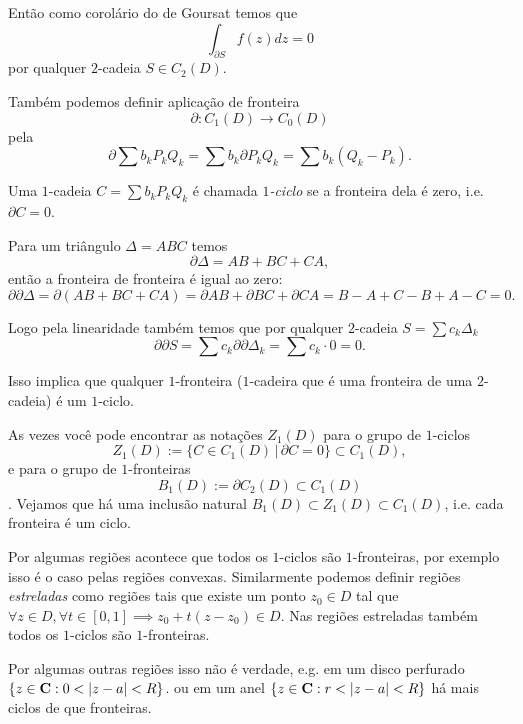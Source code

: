 Então como corolário do  de Goursat temos que
\[ \int_{\partial S} f(z) dz = 0 \]
por qualquer $2$-cadeia $S \in C_2(D)$.

Também podemos definir aplicação de fronteira 
\[ \partial : C_1(D) \to C_0(D) \]
pela
\[ \partial \sum b_k P_k Q_k = \sum b_k \partial  P_kQ_k = \sum b_k (Q_k - P_k). \]

Uma $1$-cadeia $C = \sum b_k P_k Q_k$ é chamada \emph{$1$-ciclo} se a fronteira dela é zero, i.e. $\partial C = 0$.

Para um triângulo $\Delta = ABC$ temos
\[
\partial \Delta = AB + BC + CA,
\]
então a fronteira de fronteira é igual ao zero:
\[
\partial \partial \Delta = \partial (AB + BC + CA)  = \partial AB + \partial BC + \partial CA = B-A + C-B + A-C = 0.
\]

Logo pela linearidade também temos que por qualquer $2$-cadeia $S = \sum c_k \Delta_k$
\[ \partial \partial S = \sum c_k \partial \partial \Delta_k = \sum c_k \cdot 0 =  0. \]

Isso implica que qualquer $1$-fronteira ($1$-cadeira que é uma fronteira de uma $2$-cadeia) é um $1$-ciclo.

As vezes você pode encontrar as notações $Z_1(D)$ para o grupo de $1$-ciclos
\[ Z_1(D) := \{ C \in C_1(D) \,|\, \partial C = 0 \} \subset C_1(D), \]
e para o grupo de $1$-fronteiras
\[ B_1(D) := \partial C_2(D) \subset C_1(D) \].
Vejamos que há uma inclusão natural $B_1(D) \subset Z_1(D) \subset C_1(D)$,
i.e. cada fronteira é um ciclo.

Por algumas regiões acontece que todos os $1$-ciclos são $1$-fronteiras,
por exemplo isso é o caso pelas regiões convexas.
Similarmente podemos definir regiões \emph{estreladas} como regiões tais que existe um ponto $z_0 \in D$ tal que
$\forall z\in D, \forall t \in [0,1] \implies z_0 + t (z-z_0) \in D$. Nas regiões estreladas também
todos os $1$-ciclos são $1$-fronteiras.

Por algumas outras regiões isso não é verdade,
e.g. em um disco perfurado $\{z\in\C: 0<|z-a|<R\}$.
ou em um anel $\{z\in\C: r<|z-a|<R\}$ há mais ciclos de que fronteiras.


